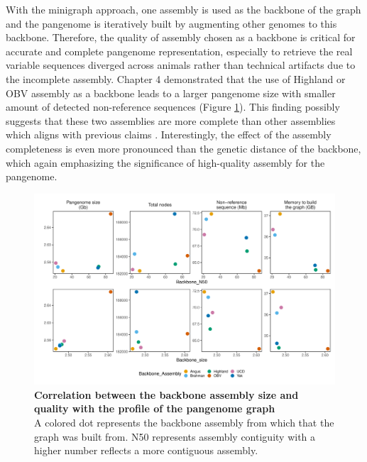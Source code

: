 \documentclass[../main.tex]{subfiles}
\begin{document}
With the minigraph approach, one assembly is used as the backbone of the graph and the pangenome is iteratively built by augmenting other genomes to this backbone. Therefore, the quality of assembly chosen as a backbone is critical for accurate and complete pangenome representation, especially to retrieve the real variable sequences diverged across animals rather than technical artifacts due to the incomplete assembly. Chapter 4 demonstrated that the use of Highland or OBV assembly as a backbone leads to a larger pangenome size with smaller amount of detected non-reference sequences (Figure \ref{fig52:backeff}). This finding possibly suggests that these two assemblies are more complete than other assemblies which aligns with previous claims \citep{rice2020continuous}. Interestingly, the effect of the assembly completeness is even more pronounced than the genetic distance of the backbone, which again emphasizing  the significance of high-quality assembly for the pangenome.  

\begin{figure}[!htb]
   \centering
   \includegraphics[width=\textwidth]{discuss/fig52.pdf}
       \vspace{1mm}
       \caption[Correlation between the backbone assembly size and quality with the profile of the pangenome graph]{\textbf{Correlation between the backbone assembly size and quality with the profile of the pangenome graph} \\
       \footnotesize{A colored dot represents the backbone assembly from which that the graph was built from. 
        N50 represents assembly contiguity with a higher number reflects a more contiguous assembly. 
       }}
       \label{fig52:backeff}
\end{figure}
\end{document}
